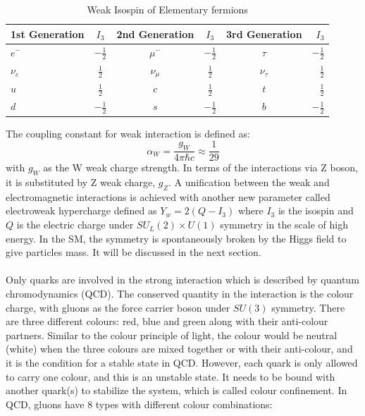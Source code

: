\begin{table}[h]
	\caption{Weak Isospin of Elementary fermions}
	\renewcommand{\arraystretch}{1.2}
	\centering
	\begin{tabular}{l c c c c r}
		\hline
		\hline
		1st Generation & $I_3$        &2nd Generation    &$I_3$        &3rd Generation   &$I_3$\\
		\hline
		$e^-$          &$-\frac{1}{2}$ &$\mu^-$           &$-\frac{1}{2}$ &$\tau$           &$-\frac{1}{2}$\\
		\hline
		$\nu_e$        &$\frac{1}{2}$  &$\nu_\mu$         &$\frac{1}{2}$  &$\nu_\tau$       &$\frac{1}{2}$\\
		\hline
		$u$            &$\frac{1}{2}$  &$c$               &$\frac{1}{2}$  &$t$              &$\frac{1}{2}$\\
		\hline
		$d$            &$-\frac{1}{2}$ &$s$               &$-\frac{1}{2}$ &$b$              &$-\frac{1}{2}$\\
		\hline

	\end{tabular}
    \label{Tab:isospin}
\end{table}
\noindent
The coupling constant for weak interaction is defined as:
\begin{equation}
\alpha_{W} = \frac{g_{W}}{4\pi\hbar c}\approx\frac{1}{29}
\end{equation}
with $g_{W}$ as the W weak charge strength. In terms of the interactions via Z boson, it is substituted by Z weak charge, $g_{Z}$. A unification between the weak and electromagnetic interactions is achieved with another new parameter called electroweak hypercharge defined as $Y_w=2 (Q-I_3)$ where $I_3$ is the isospin and $Q$ is the electric charge under $SU_L(2)\times U(1)$ symmetry in the scale of high energy.  In the SM, the symmetry is spontaneously broken by the Higgs field to give particles mass. It will be discussed in the next section.
\\
\\Only quarks are involved in the strong interaction which is described by quantum chromodynamics (QCD). The conserved quantity in the interaction is the colour charge, with gluons as the force carrier boson under $SU(3)$ symmetry. There are three different colours: red, blue and green along with their anti-colour partners. Similar to the colour principle of light, the colour would be neutral (white) when the three colours are mixed together or with their anti-colour, and it is the condition for a stable state in QCD. However, each quark is only allowed to carry one colour, and this is an unstable state. It needs to be bound with another quark(s) to stabilize the system, which is called colour confinement. In QCD, gluons have 8 types with different colour combinations:
